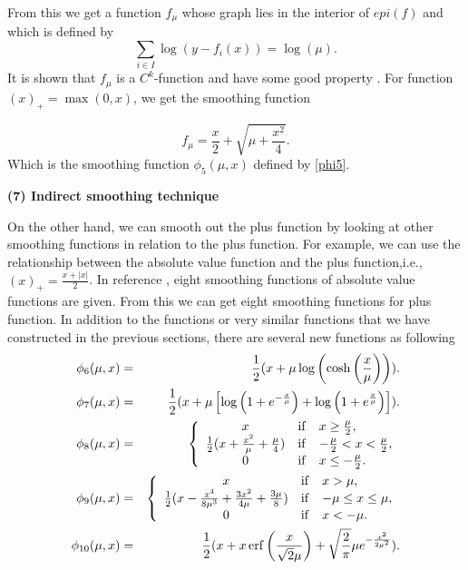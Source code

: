 \documentclass[12pt]{article}
\begin{document}
From this we get a function $f_\mu$ whose graph lies in the interior of $epi(f)$
and which is defined by
\[
\sum_{i\in I}\log \left ( y - f_i(x)\right ) = \log(\mu).
\]
It is  shown that $f_\mu$  is a  $C^k$-function and have some good
property \cite{GuerraVazquez2001}.
For function $(x)_+ = \max(0,x)$, we get the smoothing function

\begin{equation*}
f_\mu = \frac{x}{2} + \sqrt{\mu + \frac{x^2}{4}}.
\end{equation*}
Which is the smoothing function $\phi_5(\mu,x)$ defined by \eqref{phi5}.


 \noindent
 {\bf (7) Indirect smoothing technique}

 \medskip
 On the other hand, we can smooth out the plus function by looking at
 other smoothing functions in relation to the plus function.  For
 example, we can use the relationship between the absolute value
 function and the plus function,i.e.,$(x)_+ = \frac{x + |x|}{2}$.
 In reference \cite{saheya2019}, eight  smoothing functions of
 absolute value functions are given. From this we can get eight
 smoothing functions for plus function. In addition to the
 functions or very similar functions that we have constructed
 in the previous sections, there are several new functions
 as following
 \begin{eqnarray}
 \phi_6(\mu, x) &=&  \frac{1}{2}(x + \mu \log \left( \cosh \left( \frac{x}{\mu} \right) \right)). \label{phi6}\\
 \phi_7(\mu, x) &=&  \frac{1}{2}(x + \mu \left [ \log \left( 1 + e^{-\frac{x}{\mu}} \right) +
                \log \left( 1 + e^\frac{x}{\mu} \right)  \right] ). \label{phi7}  \\
 \phi_8(\mu, x)
 &=& \left \{
 \begin{array}{cll}
  x& {\rm if} & x \geq \frac{\mu}{2}, \\
  \frac{1}{2}(x + \frac{x^2}{\mu} + \frac{\mu}{4}) & {\rm if} & -\frac{\mu}{2} < x < \frac{\mu}{2}, \\
  0 & {\rm if} & x \leq -\frac{\mu}{2}.
 \end{array}
 \right. \label{phi8}  \\
 \phi_9(\mu, x) &=&
 \left\{
 \begin{array}{cll}
  x& {\rm if} &  x > \mu, \\
  \frac{1}{2}(x -\frac{x^4}{8\mu^3} + \frac{3x^2}{4\mu} + \frac{3\mu}{8} )& {\rm if} &  -\mu \leq x \leq \mu, \\
  0 & {\rm if} & x < -\mu.
 \end{array}
 \right. \label{phi9}  \\
 \phi_{10}(\mu, x) &=&  \frac{1}{2}(x + x \, {\rm erf} \left(\frac{x}{\sqrt{2}\mu}\right)
                + \sqrt{\frac{2}{\pi}}\mu e^{-\frac{x^2}{2\mu^2}}). \label{phi10}
\end{eqnarray}
\end{document}

